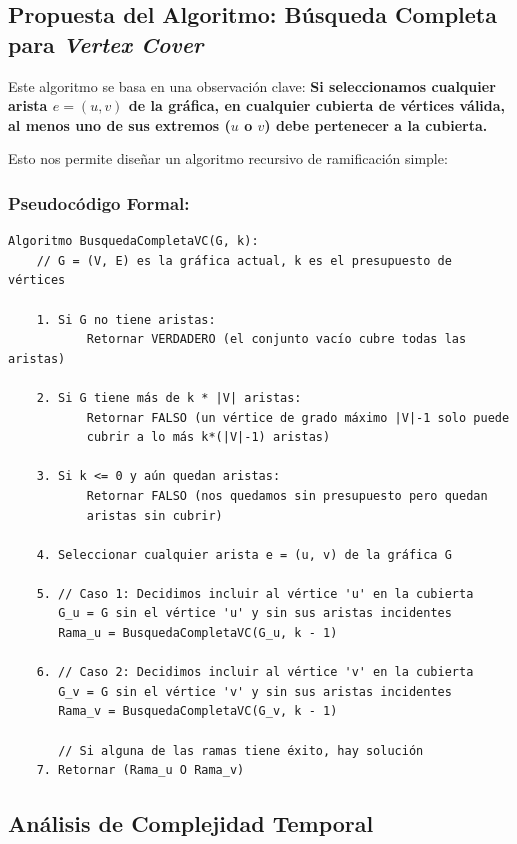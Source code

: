 \subsection*{Propuesta del Algoritmo: Búsqueda Completa para \textit{Vertex Cover}}

Este algoritmo se basa en una observación clave: \textbf{Si seleccionamos cualquier arista $e = (u, v)$ de la gráfica, en cualquier cubierta de vértices válida, al menos uno de sus extremos ($u$ o $v$) debe pertenecer a la cubierta.}

Esto nos permite diseñar un algoritmo recursivo de ramificación simple:

\subsubsection*{Pseudocódigo Formal:}
\begin{verbatim}
Algoritmo BusquedaCompletaVC(G, k):
    // G = (V, E) es la gráfica actual, k es el presupuesto de vértices
    
    1. Si G no tiene aristas:
           Retornar VERDADERO (el conjunto vacío cubre todas las aristas)
           
    2. Si G tiene más de k * |V| aristas:
           Retornar FALSO (un vértice de grado máximo |V|-1 solo puede 
           cubrir a lo más k*(|V|-1) aristas)
           
    3. Si k <= 0 y aún quedan aristas:
           Retornar FALSO (nos quedamos sin presupuesto pero quedan 
           aristas sin cubrir)
           
    4. Seleccionar cualquier arista e = (u, v) de la gráfica G
    
    5. // Caso 1: Decidimos incluir al vértice 'u' en la cubierta
       G_u = G sin el vértice 'u' y sin sus aristas incidentes
       Rama_u = BusquedaCompletaVC(G_u, k - 1)
       
    6. // Caso 2: Decidimos incluir al vértice 'v' en la cubierta
       G_v = G sin el vértice 'v' y sin sus aristas incidentes
       Rama_v = BusquedaCompletaVC(G_v, k - 1)

       // Si alguna de las ramas tiene éxito, hay solución
    7. Retornar (Rama_u O Rama_v) 
\end{verbatim}

\subsection*{Análisis de Complejidad Temporal}

